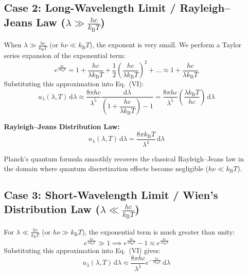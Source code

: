 \documentclass[11pt,a4paper]{article}
\newcommand{\diff}{\mathrm{d}}
\newcommand{\kB}{k_{\mathrm{B}}}
\begin{document}
\subsection{Case 2: Long-Wavelength Limit / Rayleigh--Jeans Law (\texorpdfstring{$\lambda \gg \frac{hc}{\kB T}$}{lambda >> hc/kT})}
When $\lambda \gg \frac{hc}{\kB T}$ (or $h\nu \ll \kB T$), the exponent is very small. We perform a Taylor series expansion of the exponential term:
\begin{equation}
    e^{\frac{hc}{\lambda \kB T}} = 1 + \frac{hc}{\lambda \kB T} + \frac{1}{2}\left( \frac{hc}{\lambda \kB T} \right)^2 + \dots \approx 1 + \frac{hc}{\lambda \kB T}
\end{equation}
Substituting this approximation into Eq.~(VI):
\begin{equation}
    u_\lambda(\lambda, T)\,\diff\lambda \approx \frac{8\pi hc}{\lambda^5} \frac{\diff\lambda}{\left(1 + \dfrac{hc}{\lambda \kB T}\right) - 1} 
    = \frac{8\pi hc}{\lambda^5} \left( \frac{\lambda \kB T}{hc} \right) \,\diff\lambda
\end{equation}

\begin{resultbox}
\textbf{Rayleigh--Jeans Distribution Law:}
\begin{equation}
    \boxed{u_\lambda(\lambda, T)\,\diff\lambda = \frac{8\pi \kB T}{\lambda^4} \,\diff\lambda} \tag{VII}
\end{equation}
\end{resultbox}
Planck's quantum formula smoothly recovers the classical Rayleigh--Jeans law in the domain where quantum discretization effects become negligible ($h\nu \ll \kB T$).

\subsection{Case 3: Short-Wavelength Limit / Wien's Distribution Law (\texorpdfstring{$\lambda \ll \frac{hc}{\kB T}$}{lambda << hc/kT})}
For $\lambda \ll \frac{hc}{\kB T}$ (or $h\nu \gg \kB T$), the exponential term is much greater than unity:
\begin{equation}
    e^{\frac{hc}{\lambda \kB T}} \gg 1 \implies e^{\frac{hc}{\lambda \kB T}} - 1 \approx e^{\frac{hc}{\lambda \kB T}}
\end{equation}
Substituting this approximation into Eq.~(VI) gives:
\begin{equation}
    u_\lambda(\lambda, T)\,\diff\lambda \approx \frac{8\pi hc}{\lambda^5} e^{-\frac{hc}{\lambda \kB T}} \,\diff\lambda
\end{equation}
\end{document}
